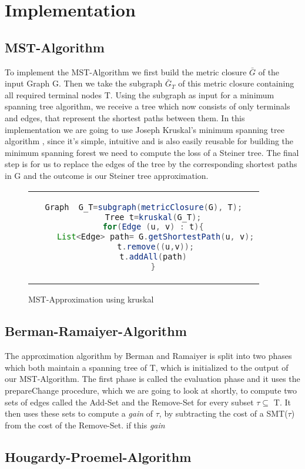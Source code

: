 
\chapter{Implementation}\label{chapter:implementation}

\section{MST-Algorithm}

To implement the MST-Algorithm we first build the metric closure $\bar{G}$ of the input Graph G. Then we take the subgraph $\bar{G}_T$ of this metric closure containing all required terminal nodes T. Using the subgraph as input for a minimum spanning tree algorithm, we receive a tree which now consists of only terminals and edges, that represent the shortest paths between them. In this implementation we are going to use Joseph Kruskal's minimum spanning tree algorithm \cite{kruskal1956shortest}, since it's simple, intuitive and is also easily reusable for building the minimum spanning forest we need to compute the loss of a Steiner tree. The final step is for us to replace the edges of the tree by the corresponding shortest paths in G and the outcome is our Steiner tree approximation.
\begin{figure}[htbp]
  \centering
  \begin{tabular}{c}
  \begin{lstlisting}[language=Java]
    Graph  G_T=subgraph(metricClosure(G), T);
    Tree t=kruskal(G_T);
    for(Edge (u, v) : t){
     List<Edge> path= G.getShortestPath(u, v);
     t.remove((u,v));
     t.addAll(path) 
    }
  \end{lstlisting}
  \end{tabular}
  \caption[mstPseudo]{MST-Approximation using kruskal}\label{fig:mstPseudo}
\end{figure}

\section{Berman-Ramaiyer-Algorithm}

The approximation algorithm by Berman and Ramaiyer is split into two phases which both maintain a spanning tree of T, which is initialized to the output of our MST-Algorithm. The first phase is called the evaluation phase and it uses the prepareChange procedure, which we are going to look at shortly, to compute two sets of edges called the Add-Set and the Remove-Set for every subset $\tau \subseteq$ T. It then uses these sets to compute a \textit{gain} of $\tau$, by subtracting the cost of a SMT($\tau$) from the cost of the Remove-Set. if this \textit{gain}

\section{Hougardy-Proemel-Algorithm}


